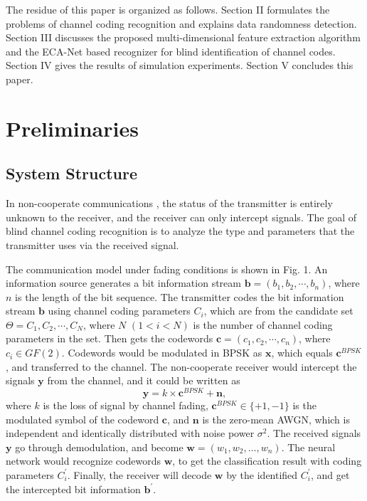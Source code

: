 \documentclass[conference]{IEEEtran}
\begin{document}


The residue of this paper is organized as follows. Section II formulates the problems of channel coding recognition and explains data randomness detection. Section III discusses the proposed multi-dimensional feature extraction algorithm and the ECA-Net based recognizer for blind identification of channel codes. Section IV gives the results of simulation experiments. Section V concludes this paper.



\section{Preliminaries}

\subsection{System Structure}
In non-cooperate communications \cite{dai2019learning}, the status of the transmitter is entirely unknown to the receiver, and the receiver can only intercept signals. The goal of blind channel coding recognition is to analyze the type and parameters that the transmitter uses via the received signal. 

The communication model under fading conditions is shown in Fig. 1. An information source generates a bit information stream $\boldsymbol{b} = ({b}_{1}, {b}_{2}, \cdots, {b}_{n})$, where $n$ is the length of the bit sequence. The transmitter codes the bit information stream $\boldsymbol{b}$ using channel coding parameters $C_i$, which are from the candidate set $\Theta={C_{1}, C_{2}, \cdots, C_{N}}$, where $N$ $(1 < i < N)$ is the number of channel coding parameters in the set. Then gets the codewords $\boldsymbol{c}=({c}_{1}, {c}_{2}, \cdots, {c}_{n})$, where $c_{i} \in {GF}(2)$. Codewords would be modulated in BPSK as $\boldsymbol{x}$, which equals $\boldsymbol{c}^{BPSK}$, and transferred to the channel. The non-cooperate receiver would intercept the signals $\boldsymbol{y}$ from the channel, and it could be written as
\begin{equation}
	\boldsymbol{y} = k \times \boldsymbol{c}^{BPSK}+\boldsymbol{n},
\end{equation}
where $k$ is the loss of signal by channel fading, $\boldsymbol{c}^{BPSK} \in \{+1,-1\}$ is the modulated symbol of the codeword $\boldsymbol{c}$, and $\boldsymbol{n}$ is the zero-mean AWGN, which is independent and identically distributed with noise power $\sigma^{2}$. The received signals $\boldsymbol{y}$ go through demodulation, and become $\boldsymbol{w} = (w_{1}, w_{2}, \ldots, w_{n})$. The neural network would recognize codewords $\boldsymbol{w}$, to get the classification result with coding parameters $C_i^{\prime}$. Finally, the receiver will decode $\boldsymbol{w}$ by the identified $C_i^{\prime}$, and get the intercepted bit information $\boldsymbol{b}^{\prime}$.
\end{document}
